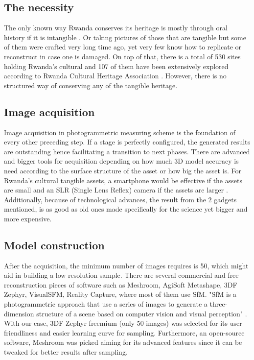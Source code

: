 \documentclass[conference]{IEEEtran}
\begin{document}
\subsection{The necessity}
The only known way Rwanda conserves its heritage is mostly through oral history if it is intangible \cite{unescorw}. Or taking pictures of those that are tangible but some of them were crafted very long time ago, yet very few know how to replicate or reconstruct in case one is damaged. On top of that, there is a total of 530 sites holding Rwanda's cultural and 107 of them have been extensively explored according to Rwanda Cultural Heritage Association \cite{rcha}. However, there is no structured way of conserving any of the tangible heritage.

\subsection{Image acquisition}
Image acquisition in photogrammetric measuring scheme is the foundation of every other preceding step. If a stage is perfectly configured, the generated results are outstanding hence facilitating a transition to next phases. There are advanced and bigger tools for acquisition depending on how much 3D model accuracy is need according to the surface structure of the asset or how big the asset is\cite{Na2022}. For Rwanda's cultural tangible assets, a smartphone would be effective if the assets are small \cite{An2022} and an SLR (Single Lens Reflex) camera if the assets are larger \cite{cam1}. Additionally, because of technological advances, the result from the 2 gadgets mentioned, is as good as old ones made specifically for the science yet bigger and more expensive. 

\subsection{Model construction}
After the acquisition, the minimum number of images requires is 50, which might aid in building a low resolution sample. There are several commercial and free reconstruction pieces of software such as Meshroom, AgiSoft Metashape, 3DF Zephyr, VisualSFM, Reality Capture, where most of them use SfM. "SfM is a photogrammetric approach that use a series of images to generate a three-dimension structure of a scene based on computer vision and visual perception" \cite{Na2022}. With our case, 3DF Zephyr freemium (only 50 images) was selected for its user-friendliness and easier learning curve for sampling. Furthermore, an open-source software, Meshroom was picked aiming for its advanced features since it can be tweaked for better results after sampling.
\end{document}
